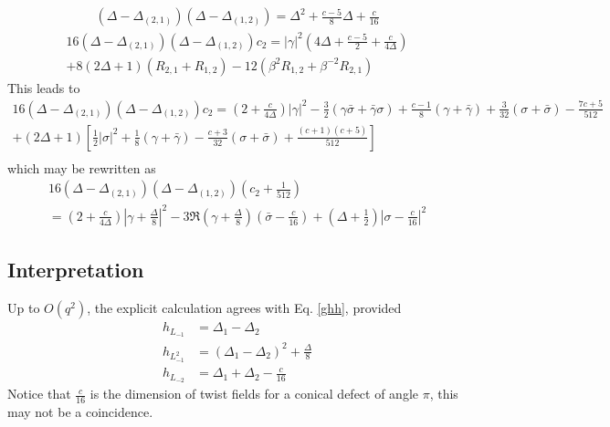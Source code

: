 \documentclass[12pt,a4paper]{article}
\begin{document}
\begin{align}
 (\Delta-\Delta_{(2,1)})(\Delta-\Delta_{(1,2)}) = \Delta^2 + \tfrac{c-5}{8}\Delta + \tfrac{c}{16}
\end{align}
\begin{multline}
 16(\Delta-\Delta_{(2,1)})(\Delta-\Delta_{(1,2)}) c_2 = |\gamma|^2\left(4\Delta + \tfrac{c-5}{2} + \tfrac{c}{4\Delta}\right)
 \\
 +8(2\Delta+1)(R_{2,1}+R_{1,2}) -12(\beta^2R_{1,2}+\beta^{-2}R_{2,1})
\end{multline}
This leads to 
\begin{multline}
 16(\Delta-\Delta_{(2,1)})(\Delta-\Delta_{(1,2)}) c_2 = \left(2+\frac{c}{4\Delta}\right)|\gamma|^2 
 -\tfrac32(\gamma\bar\sigma + \bar\gamma\sigma)+\tfrac{c-1}{8}(\gamma+\bar\gamma)+\tfrac{3}{32}(\sigma+\bar\sigma)-\tfrac{7c+5}{512}
 \\
 + (2\Delta+1)\left[\tfrac12|\sigma|^2 +\tfrac18 (\gamma+\bar\gamma) -\tfrac{c+3}{32}(\sigma+\bar\sigma)+\tfrac{(c+1)(c+5)}{512}\right] \\
\end{multline}
which may be rewritten as 
\begin{multline}
 16(\Delta-\Delta_{(2,1)})(\Delta-\Delta_{(1,2)}) \left(c_2+\tfrac{1}{512}\right) 
 \\
 = \left(2+\frac{c}{4\Delta}\right)\left|\gamma+\tfrac{\Delta}{8}\right|^2 
 -3\Re\left(\gamma+\tfrac{\Delta}{8}\right)\left(\bar\sigma-\tfrac{c}{16}\right)
 +\left(\Delta+\tfrac12\right)\left|\sigma-\tfrac{c}{16}\right|^2 
\end{multline}

\subsection{Interpretation}

Up to $O(q^2)$, the explicit calculation agrees with Eq. \eqref{ghh}, provided
\begin{subequations}
 \label{hl}
\begin{align}
 h_{L_{-1}} &= \Delta_1-\Delta_2
 \\
 h_{L_{-1}^2} &= (\Delta_1-\Delta_2)^2 +\frac{\Delta}{8}
 \\
 h_{L_{-2}} &= \Delta_1+\Delta_2-\frac{c}{16}
\end{align}
\end{subequations}
Notice that $\frac{c}{16}$ is the dimension of twist fields for a conical defect of angle $\pi$, this may not be a coincidence. 
\end{document}
